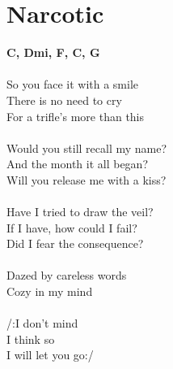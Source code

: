 \section{Narcotic}
\footnotesize\textbf{C, Dmi, F, C, G}\\
\\
\normalsize
So you face it with a smile\\
There is no need to cry\\
For a trifle's more than this\\
\\
Would you still recall my name?\\
And the month it all began?\\
Will you release me with a kiss?\\
\\
Have I tried to draw the veil?\\
If I have, how could I fail?\\
Did I fear the consequence?\\
\\
Dazed by careless words\\
Cozy in my mind\\
\\
/:I don't mind\\
I think so\\
I will let you go:/\\
